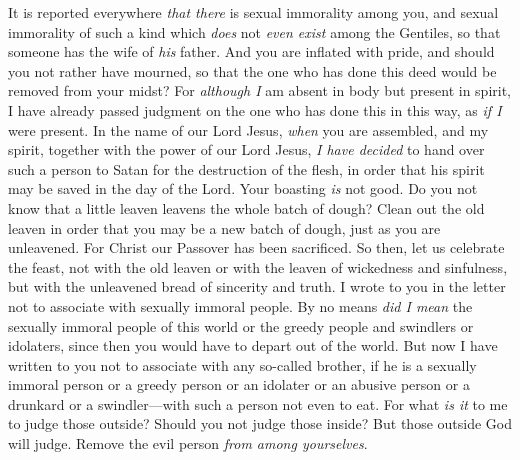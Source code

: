 \begin{biblechapter} %
 It is reported everywhere \textit{that there} is sexual immorality among you, and sexual immorality of such a kind which \textit{does} not \textit{even exist} among the Gentiles, so that someone has the wife of \textit{his} father.
\verse And you are inflated with pride, and should you not rather have mourned, so that the one who has done this deed would be removed from your midst?
\verse For \textit{although I} am absent in body but present in spirit, I have already passed judgment on the one who has done this in this way, as \textit{if I} were present.
\verse In the name of our Lord Jesus, \textit{when} you are assembled, and my spirit, together with the power of our Lord Jesus,
\verse \textit{I have decided} to hand over such a person to Satan for the destruction of the flesh, in order that his spirit may be saved in the day of the Lord.
\verse Your boasting \textit{is} not good. Do you not know that a little leaven leavens the whole batch of dough?
\verse Clean out the old leaven in order that you may be a new batch of dough, just as you are unleavened. For Christ our Passover has been sacrificed.
\verse So then, let us celebrate the feast, not with the old leaven or with the leaven of wickedness and sinfulness, but with the unleavened bread of sincerity and truth.
\verse I wrote to you in the letter not to associate with sexually immoral people.
\verse By no means \textit{did I mean} the sexually immoral people of this world or the greedy people and swindlers or idolaters, since then you would have to depart out of the world.
\verse But now I have written to you not to associate with any so-called brother, if he is a sexually immoral person or a greedy person or an idolater or an abusive person or a drunkard or a swindler—with such a person not even to eat.
\verse For what \textit{is it} to me to judge those outside? Should you not judge those inside?
\verse But those outside God will judge. Remove the evil person \textit{from among yourselves}.
\end{biblechapter}

